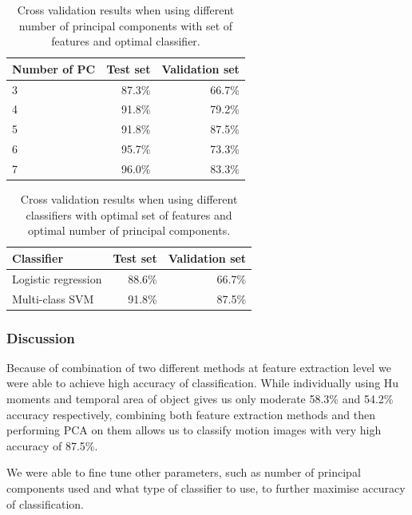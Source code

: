 \begin{table}
\begin{center}
\begin{tabular}{| l | r | r |}
\hline
Number of PC & Test set & Validation set \\ \hline
3 & 87.3\% & 66.7\% \\
4 & 91.8\% & 79.2\% \\
5 & 91.8\% & 87.5\% \\
6 & 95.7\% & 73.3\% \\
7 & 96.0\% & 83.3\% \\
\hline
\end{tabular}
\end{center}
\caption{Cross validation results when using different number of principal components with set of features and optimal classifier.}
\label{tab:pca}
\end{table}

\begin{table}
\begin{center}
\begin{tabular}{| l | r | r |}
\hline
Classifier & Test set & Validation set \\ \hline
Logistic regression & 88.6\% & 66.7\% \\
Multi-class SVM & 91.8\% & 87.5\% \\
\hline
\end{tabular}
\end{center}
\caption{Cross validation results when using different classifiers with optimal set of features and optimal number of principal components.}
\label{tab:classify}
\end{table}


\subsubsection*{Discussion}

Because of combination of two different methods at feature extraction level we were able to achieve high accuracy of classification. While individually using Hu moments and temporal area of object gives us only moderate 58.3\% and 54.2\% accuracy respectively, combining both feature extraction methods and then performing PCA on them allows us to classify motion images with very high accuracy of 87.5\%. 

We were able to fine tune other parameters, such as number of principal components used and what type of classifier to use, to further maximise accuracy of classification.

